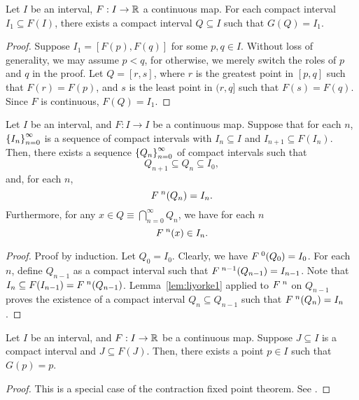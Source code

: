 \documentclass[10pt,draft,twoside]{book}
\begin{document}
\begin{lemma}
  Let $I$ be an interval, $F: I \to \mathbb{R}$ a continuous map.
  For each compact interval $I_1 \subseteq F(I)$, there exists a compact interval $Q \subseteq I$ such that $G(Q) = I_1$.
  \label{lem:liyorke1}
  \begin{proof}
    Suppose $I_1 = [F(p),F(q)]$ for some $p,q \in I$.
    Without loss of generality, we may assume $p < q$, for otherwise, we merely switch the roles of $p$ and $q$ in the proof.
    Let $Q = [r,s]$, where $r$ is the greatest point in $[p,q]$ such that $F(r) = F(p)$, and $s$ is the least point in $(r,q]$ such that $F(s) = F(q)$.
    Since $F$ is continuous, $F(Q) = I_1$.
  \end{proof}
\end{lemma}
\begin{proposition}
  Let $I$ be an interval, and $F: I\to I$ be a continuous map.
  Suppose that for each $n$, $\left \{ I_n \right \}^{\infty}_{n=0}$ is a sequence of compact intervals with $I_n \subseteq I$ and $I_{n+1} \subseteq F(I_n)$.
  Then, there exists a sequence $\left \{ Q_n \right \}^{\infty}_{n=0}$ of compact intervals such that 
\begin{equation*}
    Q_{n+1} \subseteq Q_{n} \subseteq I_0,
  \end{equation*}
and, for each $n$,
  \begin{equation*}
    F^{\;n}(Q_n) = I_n.
  \end{equation*}
  Furthermore, for any $x \in Q \equiv \bigcap\limits_{n=0}^{\infty}Q_n$, we have for each $n$
  \begin{equation*}
    F^{\;n}(x) \in I_n.
  \end{equation*}
  \label{prop:liyorke2}
  \begin{proof}
    Proof by induction.
    Let $Q_0 = I_0$.
    Clearly, we have $F^{\;0}(Q_0) = I_0$.
    For each $n$, define $Q_{n-1}$ as a compact interval such that $F^{\;n-1}(Q_{n-1}) = I_{n-1}$.
    Note that $I_n \subseteq F(I_{n-1}) = F^{\;n}(Q_{n-1})$.
    Lemma~\ref{lem:liyorke1} applied to $F^{\;n}$ on $Q_{n-1}$ proves the existence of a compact interval $Q_n \subseteq Q_{n-1}$ such that $F^{\;n}(Q_n) = I_n$.
  \end{proof}
\end{proposition}
\begin{proposition}
  Let $I$ be an interval, and $F: I\to \mathbb{R}$ be a continuous map.
  Suppose $J \subseteq I$ is a compact interval and $J \subseteq F(J)$. 
  Then, there exists a point $p \in I$ such that $G(p) = p$.
  \begin{proof}
    This is a special case of the contraction fixed point theorem.
    See \citet{sternberg}.
  \end{proof}
  \label{prop:liyorke3}
\end{proposition}
\end{document}
